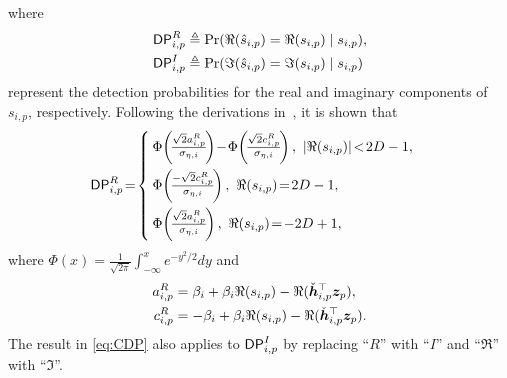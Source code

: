 \documentclass[10pt,twocolumn,twoside]{IEEEtran}
\begin{document}
where
\begin{equation*}
	\begin{split}
		{\sf DP}^R_{i,p} &\triangleq {\rm Pr}( \Re(\hat{s}_{i,p}) = \Re(s_{i,p}) \mid s_{i,p} ), \\
		{\sf DP}^I_{i,p} &\triangleq {\rm Pr}( \Im(\hat{s}_{i,p}) = \Im(s_{i,p}) \mid s_{i,p} )
	\end{split}
\end{equation*}
represent the detection probabilities for the real and imaginary components of $s_{i,p}$, respectively.
Following the derivations in~\cite{shao2019framework,liu2021symbol}, it is shown that
\begin{equation} \label{eq:CDP}
	{\sf DP}^R_{i,p} \!=\!
	\begin{cases}
		\Phi \! \left( \!\frac{\sqrt{2}a_{i,p}^R}{\sigma_{\eta,i}}\! \right) \!-\! \Phi \!\left(\! \frac{\sqrt{2}c_{i,p}^R}{\sigma_{\eta,i}} \!\right),~ | \Re(s_{i,p}) | \!<\! 2D - 1,\\[2ex]
		\Phi \! \left(\! \frac{-\sqrt{2}c_{i,p}^R}{\sigma_{\eta,i}} \!\right), ~ \Re(s_{i,p}) \!=\!  2D - 1, \\[2ex]
		\Phi \! \left(\! \frac{\sqrt{2}a_{i,p}^R}{\sigma_{\eta,i}} \!\right), ~ \Re(s_{i,p}) \!=\!  -2D + 1,
	\end{cases}
\end{equation}
where $\Phi(x) = \frac{1}{\sqrt{2\pi}} \int_{-\infty}^x e^{-{y^2}/{2}}dy$ and
\begin{equation*}
	\begin{split}
		a_{i,p}^R &=  \beta_i + \beta_i\Re(s_{i,p})  - \Re(\check {{\bm h}}_{i,p}^\top {\bm z}_p), \\
		c_{i,p}^R &= -\beta_i + \beta_i\Re(s_{i,p})  - \Re(\check {{\bm h}}_{i,p}^\top {\bm z}_p).
	\end{split}
\end{equation*}
The result in \eqref{eq:CDP} also applies to ${\sf DP}^I_{i,p}$ by replacing ``$R$'' with ``$I$'' and ``$\Re$'' with ``$\Im$''.
\end{document}
